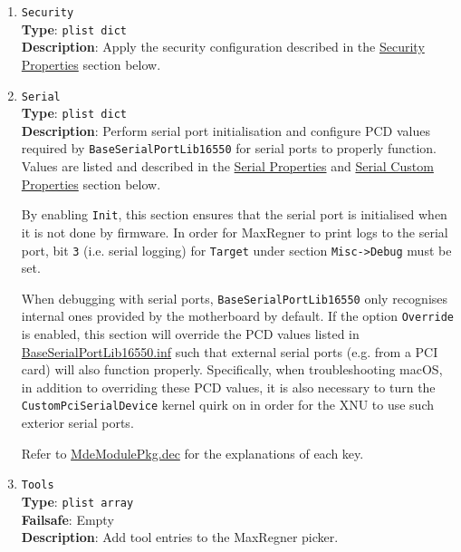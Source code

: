 \documentclass[]{article}
\makeatletter
\renewcommand{\label}[1]{%
\zref@wrapper@immediate{\oldlabel{#1}}}  %
\makeatother
\begin{document}
\begin{enumerate}
  To be filled with \texttt{plist\ dict} values, describing each load entry.
  Refer to the \hyperref[miscentryprops]{Entry Properties} section below for details.

\item
  \texttt{Security}\\
  \textbf{Type}: \texttt{plist\ dict}\\
  \textbf{Description}: Apply the security configuration described in the
  \hyperref[miscsecurityprops]{Security Properties} section below.

\item
  \texttt{Serial}\\
  \textbf{Type}: \texttt{plist\ dict}\\
  \textbf{Description}: Perform serial port initialisation and
  configure PCD values required by \texttt{BaseSerialPortLib16550} for serial ports to properly function.
  Values are listed and described in the \hyperref[miscserialprops]{Serial Properties} and \hyperref[miscserialcustprops]{Serial Custom Properties} section below.

  By enabling \texttt{Init}, this section ensures that the serial port is initialised when it is not done by firmware.
  In order for MaxRegner to print logs to the serial port, bit \texttt{3} (i.e. serial logging) for \texttt{Target}
  under section \texttt{Misc->Debug} must be set.

  When debugging with serial ports, \texttt{BaseSerialPortLib16550} only recognises internal ones
  provided by the motherboard by default. If the option \texttt{Override} is enabled, this section will override the PCD values listed in
  \href{https://github.com/acidanthera/audk/blob/master/MdeModulePkg/Library/BaseSerialPortLib16550/BaseSerialPortLib16550.inf}{BaseSerialPortLib16550.inf}
  such that external serial ports (e.g. from a PCI card) will also function properly. Specifically, when troubleshooting macOS,
  in addition to overriding these PCD values, it is also necessary to turn the \texttt{CustomPciSerialDevice} kernel quirk on in order for
  the XNU to use such exterior serial ports.


  Refer to \href{https://github.com/acidanthera/audk/blob/master/MdeModulePkg/MdeModulePkg.dec}{MdeModulePkg.dec} for the explanations of each key.

\item
  \texttt{Tools}\label{misctools}\\
  \textbf{Type}: \texttt{plist\ array}\\
  \textbf{Failsafe}: Empty\\
  \textbf{Description}: Add tool entries to the MaxRegner picker.


\end{enumerate}
\end{document}
